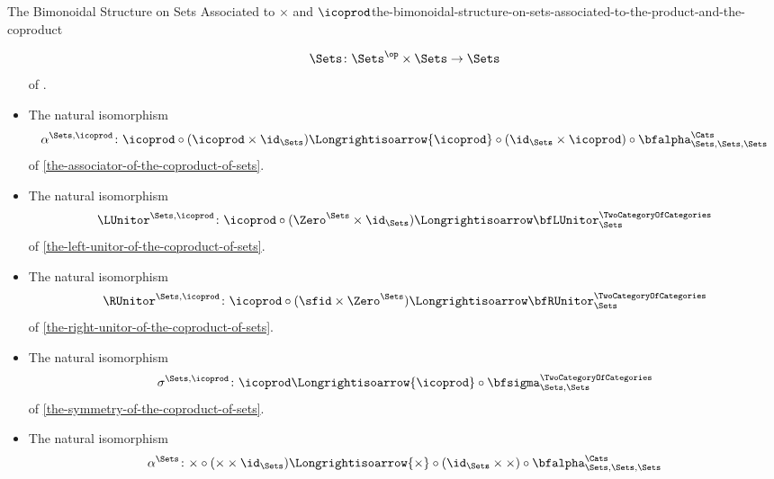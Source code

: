 \begin{proposition}{The Bimonoidal Structure on Sets Associated to $\times$ and $\icoprod$}{the-bimonoidal-structure-on-sets-associated-to-the-product-and-the-coproduct}
\begin{itemize}
            \[
                \Sets%
                \colon%
                \Sets^{\op}\times\Sets%
                \to%
                \Sets%
            \]%
            of .
        \item{}The natural isomorphism
            \[
                \alpha^{\Sets,\icoprod}
                \colon
                {\icoprod}\circ{({\icoprod}\times\id_{\Sets})}
                \Longrightisoarrow
                {\icoprod}\circ{(\id_{\Sets}\times{\icoprod})}\circ{\bfalpha^{\Cats}_{\Sets,\Sets,\Sets}}
            \]%
            of \cref{the-associator-of-the-coproduct-of-sets}.
        \item{}The natural isomorphism
            \[
                \LUnitor^{\Sets,\icoprod}%
                \colon%
                {\icoprod}\circ{(\Zero^{\Sets}\times\id_{\Sets})}
                \Longrightisoarrow
                \bfLUnitor^{\TwoCategoryOfCategories}_{\Sets}
            \]%
            of \cref{the-left-unitor-of-the-coproduct-of-sets}.
        \item{}The natural isomorphism
            \[
                \RUnitor^{\Sets,\icoprod}%
                \colon%
                {\icoprod}\circ{({\sfid}\times{\Zero^{\Sets}})}%
                \Longrightisoarrow%
                \bfRUnitor^{\TwoCategoryOfCategories}_{\Sets}%
            \]%
            of \cref{the-right-unitor-of-the-coproduct-of-sets}.
        \item{}The natural isomorphism
            \[
                \sigma^{\Sets,\icoprod}
                \colon
                {\icoprod}
                \Longrightisoarrow
                {\icoprod}\circ{\bfsigma^{\TwoCategoryOfCategories}_{\Sets,\Sets}}
            \]%
            of \cref{the-symmetry-of-the-coproduct-of-sets}.
        \item{}The natural isomorphism
            \[
                \alpha^{\Sets}
                \colon
                {\times}\circ{({\times}\times\id_{\Sets})}
                \Longrightisoarrow
                {\times}\circ{(\id_{\Sets}\times{\times})}\circ{\bfalpha^{\Cats}_{\Sets,\Sets,\Sets}}
\]
\end{itemize}
\end{proposition}

